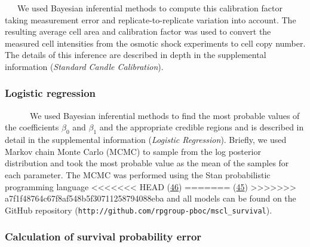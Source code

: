 ~~~We
used
Bayesian
inferential
methods
to
compute
this
calibration
factor
taking
measurement
error
and
replicate-to-replicate
variation
into
account.
The
resulting
average
cell
area
and
calibration
factor
was
used
to
convert
the
measured
cell
intensities
from
the
osmotic
shock
experiments
to
cell
copy
number.
The
details
of
this
inference
are
described
in
depth
in the
supplemental
information
(\emph{Standard
Candle
Calibration}).

\subsubsection{Logistic
regression}\label{logistic-regression}

~ ~ ~
~We
used
Bayesian
inferential
methods
to
find
the
most
probable
values
of the
coefficients
\(\beta_0\)
and
\(\beta_1\)
and
the
appropriate
credible
regions
and is
described
in
detail
in the
supplemental
information
(\emph{Logistic
Regression}).
Briefly,
we
used
Markov
chain
Monte
Carlo
(MCMC)
to
sample
from
the
log
posterior
distribution
and
took
the
most
probable
value
as the
mean
of the
samples
for
each
parameter.
The
MCMC
was
performed
using
the
Stan
probabilistic
programming
language
<<<<<<< HEAD
(\protect\hyperlink{ref-carpenter2017}{46})
=======
(\protect\hyperlink{ref-carpenter2017}{45})
>>>>>>> a7f1f48764c67f8af548b5f30711258794088eba
and
all
models
can be
found
on the
GitHub
repository
(\texttt{http://github.com/rpgroup-pboc/mscl\_survival}).

\subsubsection{Calculation
of
survival
probability
error}\label{calculation-of-survival-probability-error}

